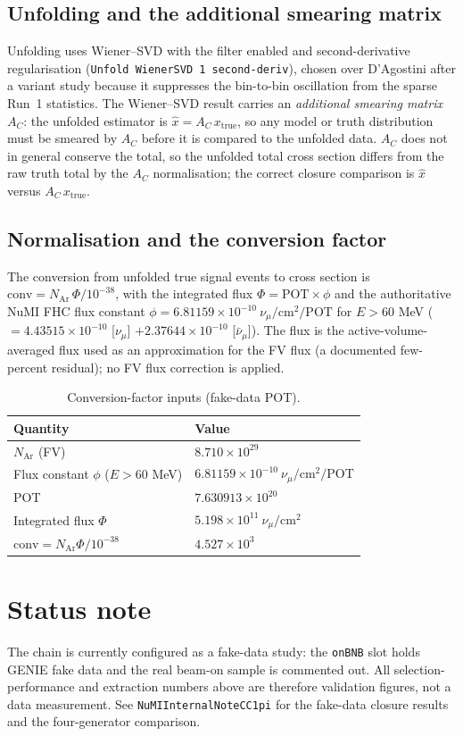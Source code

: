 \documentclass[11pt]{article}
\newcommand{\numu}{\nu_\mu}
\newcommand{\cmsq}{\mathrm{cm}^2}
\begin{document}
\subsection{Unfolding and the additional smearing matrix}
Unfolding uses Wiener--SVD with the filter enabled and second-derivative
regularisation (\texttt{Unfold WienerSVD 1 second-deriv}), chosen over
D'Agostini after a variant study because it suppresses the bin-to-bin
oscillation from the sparse Run~1 statistics. The Wiener--SVD result carries an
\emph{additional smearing matrix} $A_C$: the unfolded estimator is
$\hat{x}=A_C\,x_{\mathrm{true}}$, so any model or truth distribution must be
smeared by $A_C$ before it is compared to the unfolded data. $A_C$ does not in
general conserve the total, so the unfolded total cross section differs from the
raw truth total by the $A_C$ normalisation; the correct closure comparison is
$\hat{x}$ versus $A_C\,x_{\mathrm{true}}$.

\subsection{Normalisation and the conversion factor}
The conversion from unfolded true signal events to cross section is
$\mathrm{conv} = N_{\mathrm{Ar}}\,\Phi/10^{-38}$, with the integrated flux
$\Phi = \mathrm{POT}\times\phi$ and the authoritative NuMI FHC flux constant
$\phi = 6.81159\times10^{-10}~\numu/\mathrm{cm}^2/\mathrm{POT}$ for $E>60$ MeV
($= 4.43515\times10^{-10}$ [$\numu$] $+ 2.37644\times10^{-10}$ [$\bar\numu$]).
The flux is the active-volume-averaged flux used as an approximation for the FV
flux (a documented few-percent residual); no FV flux correction is applied.
\begin{table}[htbp]\centering
\caption{Conversion-factor inputs (fake-data POT).}
\begin{tabular}{ll}
\toprule
Quantity & Value\\
\midrule
$N_{\mathrm{Ar}}$ (FV) & $8.710\times10^{29}$\\
Flux constant $\phi$ ($E>60$ MeV) & $6.81159\times10^{-10}~\numu/\cmsq/$POT\\
POT & $7.630913\times10^{20}$\\
Integrated flux $\Phi$ & $5.198\times10^{11}~\numu/\cmsq$\\
$\mathrm{conv} = N_{\mathrm{Ar}}\Phi/10^{-38}$ & $4.527\times10^{3}$\\
\bottomrule
\end{tabular}
\end{table}

\section*{Status note}
The chain is currently configured as a fake-data study: the \texttt{onBNB} slot
holds GENIE fake data and the real beam-on sample is commented out. All
selection-performance and extraction numbers above are therefore validation
figures, not a data measurement. See \texttt{NuMIInternalNoteCC1pi} for the
fake-data closure results and the four-generator comparison.
\end{document}
